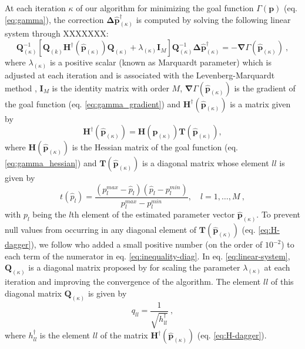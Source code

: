 At each iteration $\kappa$ of our algorithm for minimizing the 
goal function $\Gamma(\mathbf{p})$ (eq. \ref{eq:gamma}), 
the correction $\boldsymbol{\Delta}\hat{\mathbf{p}}^{\dagger}_{(\kappa)}$ is 
computed by solving the following linear system through XXXXXXX:
\begin{equation}\label{eq:linear-system}
\mathbf{Q}_{(\kappa)}^{-1} \left[\mathbf{Q}_{(k)} \mathbf{H}^{\dagger}(\hat{\mathbf{p}}_{(\kappa)}) \mathbf{Q}_{(\kappa)} + \lambda_{(\kappa)} \mathbf{I}_{M} \right] 
\mathbf{Q}_{(\kappa)}^{-1} \boldsymbol{\Delta} \hat{\mathbf{p}}^{\dagger}_{(\kappa)} 
= -\boldsymbol{\nabla}\Gamma(\hat{\mathbf{p}}_{(\kappa)}) \: ,
\end{equation}
where $\lambda_{(\kappa)}$ is a positive scalar (known as Marquardt parameter) which is adjusted at each iteration and 
is associated with the Levenberg-Marquardt method \cite[e.g., ][ p. 240]{silva-2001,aster-etal2019},
$\mathbf{I}_{M}$ is the identity matrix with order $M$, $\boldsymbol{\nabla}\Gamma(\hat{\mathbf{p}}_{(\kappa)})$
is the gradient of the 
goal function (eq. \ref{eq:gamma_gradient}) and $\mathbf{H}^{\dagger}(\hat{\mathbf{p}}_{(\kappa)})$ is a matrix given by
\begin{equation}\label{eq:H-dagger}
\mathbf{H}^{\dagger}(\hat{\mathbf{p}}_{(\kappa)}) = \mathbf{H}(\hat{\mathbf{p}}_{(\kappa)})\mathbf{T}(\hat{\mathbf{p}}_{(\kappa)}),
\end{equation}
where $\mathbf{H}(\hat{\mathbf{p}}_{(\kappa)})$ is the Hessian matrix of the goal function (eq. \ref{eq:gamma_hessian}) and $\mathbf{T}(\hat{\mathbf{p}}_{(\kappa)})$ is a diagonal matrix whose element $ll$ is given by
\begin{equation}\label{eq:inequality-diag}
t(\hat{p}_{l}) = \frac{(p_{l}^{max} - \hat{p}_{l})(\hat{p}_{l} - p_{l}^{min})}{p_{l}^{max} - p_{l}^{min}}, \quad l = 1, \dots, M \: ,
\end{equation}
with $p_{l}$ being the $l$th element of the estimated parameter vector $\hat{\mathbf{p}}_{(\kappa)}$. 
To prevent null values from occurring in any diagonal element of $\mathbf{T}(\hat{\mathbf{p}}_{(\kappa)})$ (eq. \ref{eq:H-dagger}),  we follow \cite{barbosa-1999b} who added a small positive number (on the order of $10^{-2}$)  to each term of the numerator in eq. \ref{eq:inequality-diag}.
In eq. \ref{eq:linear-system}, $\mathbf{Q}_{(\kappa)}$ is a diagonal matrix proposed by  \cite{marquardt_algorithm_1963} for scaling the parameter $\lambda_{(\kappa)}$ at each iteration and improving the convergence of the algorithm. 
The element $ll$ of this diagonal matrix $\mathbf{Q}_{(\kappa)}$  is given by
\begin{equation}\label{eq:Q-matrix}
q_{ll} = \frac{1}{\sqrt{h^{\dagger}_{ll}}} \: ,
\end{equation}
where $h^{\dagger}_{ll}$ is the element $ll$ of the matrix $\mathbf{H}^{\dagger}(\hat{\mathbf{p}}_{(\kappa)})$ (eq. \ref{eq:H-dagger}). 

